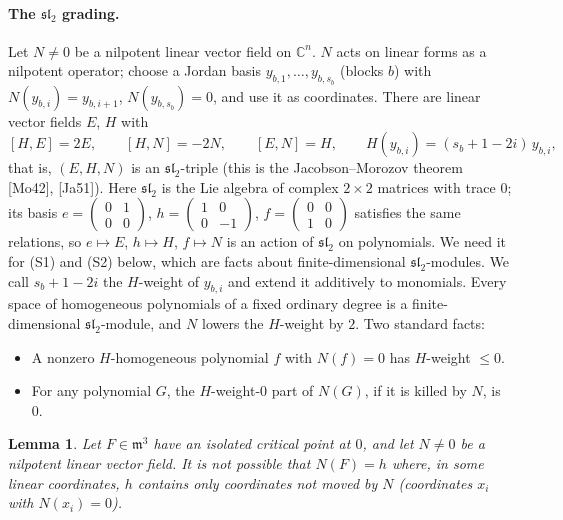 \documentclass[11pt]{article}
\newcommand{\C}{\mathbb{C}}
\newtheorem{lemma}[theorem]{Lemma}
\theoremstyle{remark}
\begin{document}
\paragraph{The $\mathfrak{sl}_2$ grading.} Let $N\ne0$ be a nilpotent linear vector field on $\C^n$. $N$ acts on linear forms as a nilpotent operator; choose a Jordan basis $y_{b,1},\dots,y_{b,s_b}$ (blocks $b$) with $N(y_{b,i})=y_{b,i+1}$, $N(y_{b,s_b})=0$, and use it as coordinates. There are linear vector fields $E$, $H$ with
\[
[H,E]=2E,\qquad [H,N]=-2N,\qquad [E,N]=H,\qquad H(y_{b,i})=(s_b+1-2i)\,y_{b,i},
\]
that is, $(E,H,N)$ is an $\mathfrak{sl}_2$-triple (this is the Jacobson--Morozov theorem [Mo42], [Ja51]). Here $\mathfrak{sl}_2$ is the Lie algebra of complex $2\times2$ matrices with trace $0$; its basis $e=\begin{pmatrix}0&1\\0&0\end{pmatrix}$, $h=\begin{pmatrix}1&0\\0&-1\end{pmatrix}$, $f=\begin{pmatrix}0&0\\1&0\end{pmatrix}$ satisfies the same relations, so $e\mapsto E$, $h\mapsto H$, $f\mapsto N$ is an action of $\mathfrak{sl}_2$ on polynomials. We need it for (S1) and (S2) below, which are facts about finite-dimensional $\mathfrak{sl}_2$-modules. We call $s_b+1-2i$ the $H$-weight of $y_{b,i}$ and extend it additively to monomials. Every space of homogeneous polynomials of a fixed ordinary degree is a finite-dimensional $\mathfrak{sl}_2$-module, and $N$ lowers the $H$-weight by $2$. Two standard facts:
\begin{itemize}
\item[(S1)] A nonzero $H$-homogeneous polynomial $f$ with $N(f)=0$ has $H$-weight $\le0$.
\item[(S2)] For any polynomial $G$, the $H$-weight-$0$ part of $N(G)$, if it is killed by $N$, is $0$.
\end{itemize}

\begin{lemma}\label{lem:J}
Let $F\in\mathfrak m^3$ have an isolated critical point at $0$, and let $N\ne0$ be a nilpotent linear vector field. It is not possible that $N(F)=h$ where, in some linear coordinates, $h$ contains only coordinates not moved by $N$ (coordinates $x_i$ with $N(x_i)=0$).
\end{lemma}
\end{document}
